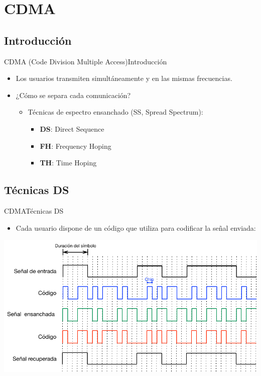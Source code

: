 \documentclass[10pt,compress]{beamer} %
\begin{document}
\section{CDMA}
\subsection{Introducción}
\begin{frame}{CDMA (Code Division Multiple Access)}{Introducción}
  \begin{itemize}
    \item Los usuarios transmiten simultáneamente y en las mismas frecuencias.
    \item ¿Cómo se separa cada comunicación?
    \begin{itemize}
      \item Técnicas de espectro ensanchado (SS, Spread Spectrum):
      \begin{itemize}
        \item {\bf DS}: Direct Sequence
        \item {\bf FH}: Frequency Hoping
        \item {\bf TH}: Time Hoping
      \end{itemize}
    \end{itemize}
  \end{itemize}
\end{frame}

\subsection{Técnicas DS}
\begin{frame}{CDMA}{Técnicas DS}
  \begin{itemize}
    \item Cada usuario dispone de un código que utiliza para codificar la señal enviada:
  \end{itemize}
  \centering \includegraphics[width=0.8\linewidth]{Figuras/DS-CDMA.pdf}
\end{frame}
\end{document}
